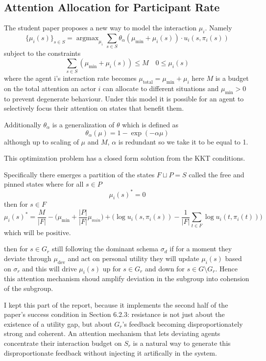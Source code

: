 \documentclass[12pt]{article}
\begin{document}
\subsection{Attention Allocation for Participant Rate}
The student paper proposes a new way to model the interaction $\mu_i$. Namely
\[ \{ \mu_i(s)\}_{s\in S} = \operatorname{argmax}_{\mu_i} \sum_{s \in S} \theta_\alpha(\mu_{\text{min}} + \mu_i(s))\cdot u_i(s, \pi_i(s)) \]
subject to the constraints
\[ \sum_{s \in S}(\mu_{\text{min}} + \mu_i(s)) \leq M  \quad 0 \leq \mu_i(s) \]
where the agent i's interaction rate becomes $\mu_{\text{total}} = \mu_{\text{min}} + \mu_i$
here $M$ is a budget on the total attention an actor $i$ can allocate to different situations and $\mu_{\text{min}} > 0$ to prevent degenerate behaviour.
Under this model it is possible for an agent to selectively focus their attention on states that benefit them.

Additionally $\theta_\alpha$ is a generalization of $\theta$ which is defined as
\[ \theta_\alpha(\mu) = 1 - \exp(-\alpha\mu) \]
although up to scaling of $\mu$ and $M$, $\alpha$ is redundant so we take it to be equal to 1.

This optimization problem has a closed form solution from the KKT conditions.

Specifically there emerges a partition of the states $F \sqcup P = S$ called
the free and pinned states
where for all $s \in P$
\[ \mu_i(s)^* = 0 \]
then for $s \in F$
\[ \mu_i(s)^* = \frac{M}{|F|} - \Big(\mu_{\text{min}} + \frac{|P|}{|F|}\mu_{min} \Big) + \Big(\log u_i(s, \pi_i(s)) - \frac{1}{|F|}\sum_{t \in F}\log u_i(t, \pi_i(t))\Big) \]
which will be positive.

then for $s \in G_r$ still following the dominant schema $\sigma_d$ if for a moment they deviate
through $\mu_{\text{dev}}$ and act on personal utility they will update $\mu_i(s)$
based on $\sigma_r$ and this will drive $\mu_i(s)$ up for $s \in G_r$ and down for $s \in G \setminus G_r$.
Hence this attention mechanism shoud amplify deviation in the subgroup into cohension of the subgroup.

I kept this part of the report, because it implements the second half of the paper's success condition in Section 6.2.3:
resistance is not just about the existence of a utility gap, but about $G_r$'s feedback becoming disproportionately strong and coherent.
An attention mechanism that lets deviating agents concentrate their interaction budget on $S_r$ is a natural way to generate this disproportionate feedback
without injecting it artifically in the system.
\end{document}
